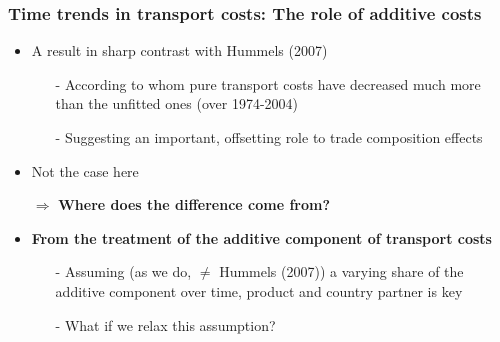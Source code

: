 \documentclass[10 pt,Helvetica, french]{beamer}
\begin{document}

\begin{frame}[label = slide_compeffects_comparison]
\frametitle{Time trends in transport costs: The role of additive costs}
\begin{itemize}
\item A result in sharp contrast with Hummels (2007) \vspace{0.1cm}
\begin{itemize}
\item[-] According to whom pure transport costs have decreased much more than the unfitted ones (over 1974-2004) \vspace{0.1cm}
\item[-] Suggesting an important, offsetting role to trade composition effects  \vspace{0.1cm}
\end{itemize}
\pause
\item Not the case here \vspace{0.1cm}
\item[$\Rightarrow$] \textbf{Where does the difference come from?} \vspace{0.1cm}
\pause
\item \textbf{From the treatment of the additive component of transport costs} \hyperlink{app_compeffects_Hummels}{}\vspace{0.1cm}
\begin{itemize}
\item[-] Assuming (as we do, $\neq$ Hummels (2007)) a varying share of the additive component over time, product and country partner is key \vspace{0.1cm}
\item[-] What if we relax this assumption?
\end{itemize}\vspace{0.1cm}
\end{itemize}

\end{frame}

\end{document}
